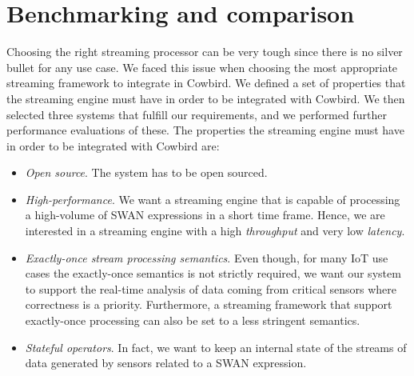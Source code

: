 \section{Benchmarking and comparison}
Choosing the right streaming processor can be very tough since there is no silver bullet for any use case. We faced this issue when choosing the most appropriate streaming framework to integrate in Cowbird. We defined a set of properties that the streaming engine must have in order to be integrated with Cowbird. We then selected three systems that fulfill our requirements, and we performed further performance evaluations of these. The properties the streaming engine must have in order to be integrated with Cowbird are:
\begin{itemize}
\item \emph{Open source}. The system has to be open sourced.
\item \emph{High-performance}. We want a streaming engine that is capable of processing a high-volume of SWAN expressions in a short time frame. Hence, we are interested in a streaming engine with a high \emph{throughput} and very low \emph{latency}.
\item \emph{Exactly-once stream processing semantics}. Even though, for many IoT use cases the exactly-once semantics is not strictly required, we want our system to support the real-time analysis of data coming from critical sensors where correctness is a priority. Furthermore, a streaming framework that support exactly-once processing can also be set to a less stringent semantics. 
\item \emph{Stateful operators}. In fact, we want to keep an internal state of the streams of data generated by sensors related to a SWAN expression.
\end{itemize}

